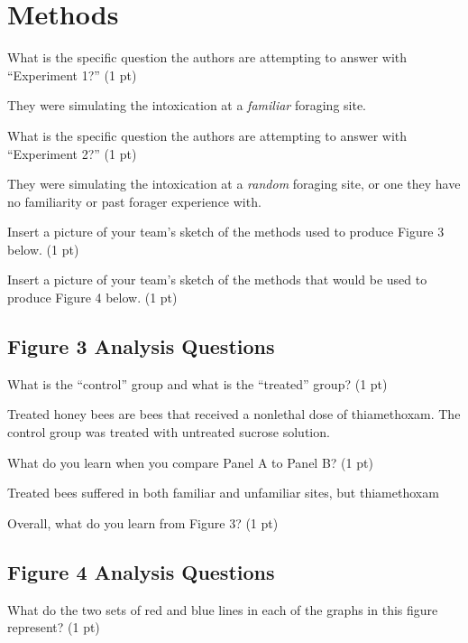 \documentclass[12pt,a4paper]{article}
\begin{document}
\section*{Methods}
\begin{enumerate}[font=\bfseries, wide, resume]
    {\color{under}\item What is the specific question the authors are attempting to answer with “Experiment 1?” (1 pt)}
    
    They were simulating the intoxication at a \textit{familiar} foraging site. 

    {\color{under}\item What is the specific question the authors are attempting to answer with “Experiment 2?” (1 pt)}
    
    They were simulating the intoxication at a \textit{random} foraging site, or one they have no familiarity or past forager experience with. 

    {\color{under}\item Insert a picture of your team’s sketch of the methods used to produce Figure 3 below. (1 pt)}
    


    {\color{under}\item Insert a picture of your team’s sketch of the methods that would be used to produce Figure 4 below. (1 pt)}
    
    \subsection*{Figure 3 Analysis Questions}
    {\color{under}\item What is the “control” group and what is the “treated” group? (1 pt)}
    
    Treated honey bees are bees that received a nonlethal dose of thiamethoxam. The control group was treated with untreated sucrose solution. 

    {\color{under}\item What do you learn when you compare Panel A to Panel B? (1 pt)}

    Treated bees suffered in both familiar and unfamiliar sites, but thiamethoxam
    {\color{under}\item Overall, what do you learn from Figure 3? (1 pt)}
    
    \subsection*{Figure 4 Analysis Questions}
    {\color{under}\item  What do the two sets of red and blue lines in each of the graphs in this figure represent? (1 pt)}
    

\end{enumerate}
\end{document}

